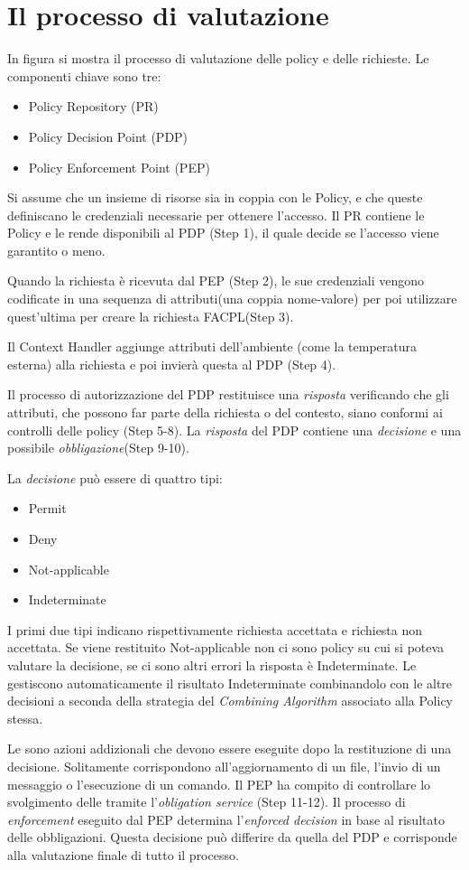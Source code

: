 \section{Il processo di valutazione}
\label{sec:Il processo di valutazione}
In figura si mostra il processo di valutazione delle policy e delle richieste. Le componenti chiave sono tre:
\begin{itemize}
  \item Policy Repository (PR)
  \item Policy Decision Point (PDP)
  \item Policy Enforcement Point (PEP)
\end{itemize}
Si assume che un insieme di risorse sia in coppia con le Policy, e che queste definiscano le credenziali
necessarie per ottenere l'accesso. Il PR contiene le Policy e le rende disponibili al PDP (Step 1), il
quale decide se l'accesso viene garantito o meno. \par
Quando la richiesta è ricevuta dal PEP (Step 2), le sue credenziali vengono codificate in una sequenza
di attributi(una coppia nome-valore) per poi utilizzare quest'ultima per creare la richiesta FACPL(Step 3).\par
Il Context Handler aggiunge attributi dell'ambiente (come la temperatura esterna) alla richiesta e
poi invierà questa al PDP (Step 4).\par
Il processo di autorizzazione del PDP restituisce una \emph{risposta} verificando che gli attributi, che possono far
parte della richiesta o del contesto, siano conformi ai controlli delle policy (Step 5-8). La \emph{risposta} del PDP
contiene una \emph{decisione} e una possibile \emph{obbligazione}(Step 9-10).\par
La \emph{decisione} può essere di quattro tipi:
\begin{itemize}
  \item Permit
  \item Deny
  \item Not-applicable
  \item Indeterminate
\end{itemize}
I primi due tipi indicano rispettivamente richiesta accettata e richiesta non accettata. Se viene restituito Not-applicable
non ci sono policy su cui si poteva valutare la decisione, se ci sono altri errori la risposta è Indeterminate.
Le \ePolicy gestiscono automaticamente il risultato Indeterminate combinandolo con le altre decisioni
a seconda della strategia del \emph{Combining Algorithm} associato alla Policy stessa.\par
Le \eObligations sono azioni addizionali che devono essere eseguite dopo la restituzione di una decisione.
Solitamente corrispondono all'aggiornamento di un file, l'invio di un messaggio o l'esecuzione di un comando.
Il PEP ha compito di controllare lo svolgimento delle \eObligations tramite l'\emph{obligation service} (Step 11-12).
Il processo di \emph{enforcement} eseguito dal PEP determina l'\emph{enforced decision} in base al risultato delle obbligazioni.
Questa decisione può differire da quella del PDP e corrisponde alla valutazione finale di tutto il processo.

